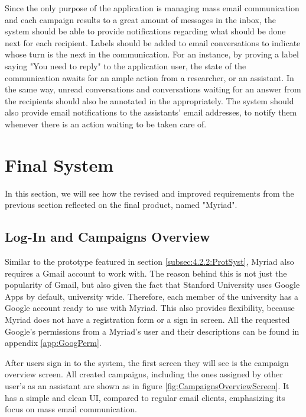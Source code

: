 Since the only purpose of the application is managing mass email communication and each campaign results to a great amount of messages in the inbox, the system should be able to provide notifications regarding what should be done next for each recipient. Labels should be added to email conversations to indicate whose turn is the next in the communication. For an instance, by proving a label saying "You need to reply" to the application user, the state of the communication awaits for an ample action from a researcher, or an assistant. In the same way, unread conversations and conversations waiting for an answer from the recipients should also be annotated in the appropriately. The system should also provide email notifications to the assistants' email addresses, to notify them whenever there is an action waiting to be taken care of.

\section{Final System}
\label{sec:5.2:FinaSyst}
In this section, we will see how the revised and improved requirements from the previous section reflected on the final product, named "Myriad".

\subsection{Log-In and Campaigns Overview}
\label{subsec:5.2.1:CampOver}

Similar to the prototype featured in section \ref{subsec:4.2.2:ProtSyst}, Myriad also requires a Gmail account to work with. The reason behind this is not just the popularity of Gmail, but also given the fact that Stanford University uses Google Apps by default, university wide. Therefore, each member of the university has a Google account ready to use with Myriad. This also provides flexibility, because Myriad does not have a registration form or a sign in screen. All the requested Google's permissions from a Myriad's user and their descriptions can be found in appendix \ref{app:GoogPerm}.
\vspace{1cm}

After users sign in to the system, the first screen they will see is the campaign overview screen. All created campaigns, including the ones assigned by other user's as an assistant are shown as in figure \ref{fig:CampaignsOverviewScreen}. It has a simple and clean \ac{UI}, compared to regular email clients, emphasizing its focus on mass email communication.

